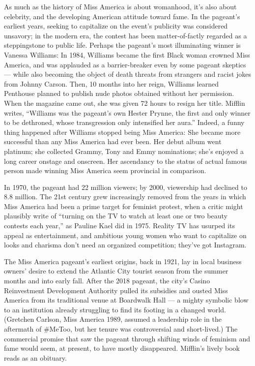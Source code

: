 As much as the history of Miss America is about womanhood, it's also
about celebrity, and the developing American attitude toward fame. In
the pageant's earliest years, seeking to capitalize on the event's
publicity was considered unsavory; in the modern era, the contest has
been matter-of-factly regarded as a steppingstone to public life.
Perhaps the pageant's most illuminating winner is Vanessa Williams: In
1984, Williams became the first Black woman crowned Miss America, and
was applauded as a barrier-breaker even by some pageant skeptics ---
while also becoming the object of death threats from strangers and
racist jokes from Johnny Carson. Then, 10 months into her reign,
Williams learned Penthouse planned to publish nude photos obtained
without her permission. When the magazine came out, she was given 72
hours to resign her title. Mifflin writes, ``Williams was the pageant's
own Hester Prynne, the first and only winner to be dethroned, whose
transgression only intensified her aura.'' Indeed, a funny thing
happened after Williams stopped being Miss America: She became more
successful than any Miss America had ever been. Her debut album went
platinum; she collected Grammy, Tony and Emmy nominations; she's enjoyed
a long career onstage and onscreen. Her ascendancy to the status of
actual famous person made winning Miss America seem provincial in
comparison.

In 1970, the pageant had 22 million viewers; by 2000, viewership had
declined to 8.8 million. The 21st century grew increasingly removed from
the years in which Miss America had been a prime target for feminist
protest, when a critic might plausibly write of ``turning on the TV to
watch at least one or two beauty contests each year,'' as Pauline Kael
did in 1975. Reality TV has usurped its appeal as entertainment, and
ambitious young women who want to capitalize on looks and charisma don't
need an organized competition; they've got Instagram.

The Miss America pageant's earliest origins, back in 1921, lay in local
business owners' desire to extend the Atlantic City tourist season from
the summer months and into early fall. After the 2018 pageant, the
city's Casino Reinvestment Development Authority pulled its subsidies
and ousted Miss America from its traditional venue at Boardwalk Hall ---
a mighty symbolic blow to an institution already struggling to find its
footing in a changed world. (Gretchen Carlson, Miss America 1989,
assumed a leadership role in the aftermath of \#MeToo, but her tenure
was controversial and short-lived.) The commercial promise that saw the
pageant through shifting winds of feminism and fame would seem, at
present, to have mostly disappeared. Mifflin's lively book reads as an
obituary.


